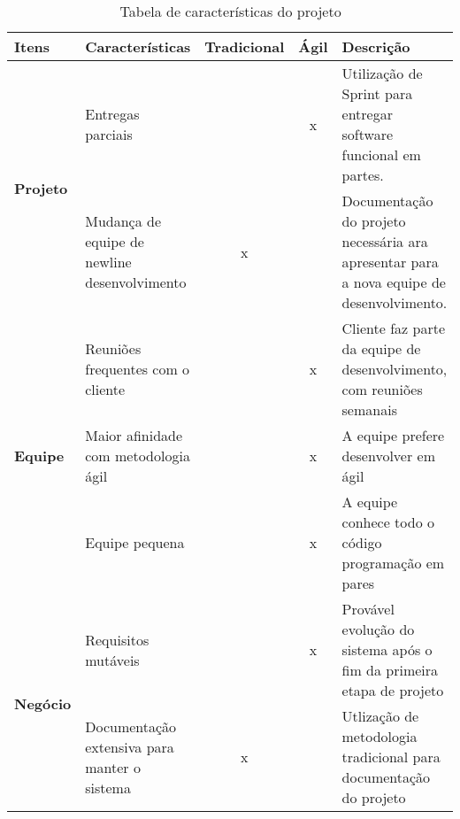 \begin{table}[h]
    \begin{tabular}{|p{2cm}|p{5cm}|c|c|p{4cm}|}
        \hline
        \textbf{Itens} &
        \textbf{Características} &
        \textbf{Tradicional} &
        \textbf{Ágil} &
        \textbf{Descrição}
        \\ 
        \hline
        \multirow{2}{*}{
            \textbf{Projeto}} &
                Entregas parciais &
                 &
                x &
                Utilização de Sprint para entregar software funcional em partes.
                \\
                \cline{2-5} 
                 &
                Mudança de equipe de newline desenvolvimento &
                x &
                 &
                Documentação do projeto necessária  ara apresentar para a nova equipe de desenvolvimento. 
                \\ 
                \hline
        \multirow{3}{*}{
            \textbf{Equipe}} &
                Reuniões frequentes com o cliente &
                 &
                x &
                Cliente faz parte da equipe de desenvolvimento, com reuniões semanais
                \\
                \cline{2-5}
                 &
                Maior afinidade com metodologia ágil &
                 &
                x &
                A equipe prefere desenvolver em ágil
                \\
                \cline{2-5} 
                 &
                Equipe pequena &
                 &
                x &
                A equipe conhece todo o código programação em pares
                \\
                \hline
        \multirow{2}{*}{
            \textbf{Negócio}}
                 &
                Requisitos mutáveis &
                 &
                x &
                Provável evolução do sistema após o fim da primeira etapa de projeto
                \\
                \cline{2-5}
                 &
                Documentação extensiva para manter o sistema &
                x &
                 &
                Utlização de metodologia tradicional para documentação do projeto
                \\
                \hline
    \end{tabular}
    \caption{Tabela de características do projeto}
    \label{tab:caracteristcas_do_projeto}
\end{table}

